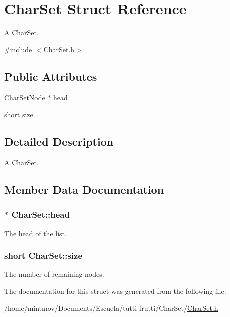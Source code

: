\hypertarget{structCharSet}{\section{Char\-Set Struct Reference}
\label{structCharSet}
}


A \hyperlink{structCharSet}{Char\-Set}.  




{\ttfamily \#include $<$Char\-Set.\-h$>$}

\subsection*{Public Attributes}
\begin{DoxyCompactItemize}
\item 
\hyperlink{structCharSetNode}{Char\-Set\-Node} $\ast$ \hyperlink{structCharSet_abd323ad9028016ccca6336eca8bcf25c}{head}
\item 
short \hyperlink{structCharSet_ab471d0bd3923ba863d7d80eb1ba08609}{size}
\end{DoxyCompactItemize}


\subsection{Detailed Description}
A \hyperlink{structCharSet}{Char\-Set}. 

\subsection{Member Data Documentation}
\hypertarget{structCharSet_abd323ad9028016ccca6336eca8bcf25c}{
\subsubsection[{head}]{$\ast$ Char\-Set\-::head}}\label{structCharSet_abd323ad9028016ccca6336eca8bcf25c}
The head of the list. \hypertarget{structCharSet_ab471d0bd3923ba863d7d80eb1ba08609}{
\subsubsection[{size}]{\setlength{\rightskip}{0pt plus 5cm}short Char\-Set\-::size}}\label{structCharSet_ab471d0bd3923ba863d7d80eb1ba08609}
The number of remaining nodes. 

The documentation for this struct was generated from the following file\-:\begin{DoxyCompactItemize}
\item 
/home/mintmov/\-Documents/\-Escuela/tutti-\/frutti/\-Char\-Set/\hyperlink{CharSet_8h}{Char\-Set.\-h}\end{DoxyCompactItemize}

